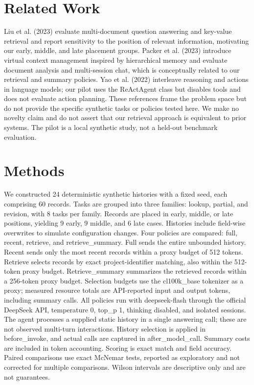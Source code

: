 \documentclass{article}
\begin{document}
\section{Related Work}
Liu et al. (2023) evaluate multi-document question answering and key-value retrieval and report sensitivity to the position of relevant information, motivating our early, middle, and late placement groups. Packer et al. (2023) introduce virtual context management inspired by hierarchical memory and evaluate document analysis and multi-session chat, which is conceptually related to our retrieval and summary policies. Yao et al. (2022) interleave reasoning and actions in language models; our pilot uses the ReActAgent class but disables tools and does not evaluate action planning. These references frame the problem space but do not provide the specific synthetic tasks or policies tested here. We make no novelty claim and do not assert that our retrieval approach is equivalent to prior systems. The pilot is a local synthetic study, not a held-out benchmark evaluation.
\section{Methods}
We constructed 24 deterministic synthetic histories with a fixed seed, each comprising 60 records. Tasks are grouped into three families: lookup, partial, and revision, with 8 tasks per family. Records are placed in early, middle, or late positions, yielding 9 early, 9 middle, and 6 late cases. Histories include field-wise overwrites to simulate configuration changes. Four policies are compared: full, recent, retrieve, and retrieve\_summary. Full sends the entire unbounded history. Recent sends only the most recent records within a proxy budget of 512 tokens. Retrieve selects records by exact project-identifier matching, also within the 512-token proxy budget. Retrieve\_summary summarizes the retrieved records within a 256-token proxy budget. Selection budgets use the cl100k\_base tokenizer as a proxy; measured resource totals are API-reported input and output tokens, including summary calls. All policies run with deepseek-flash through the official DeepSeek API, temperature 0, top\_p 1, thinking disabled, and isolated sessions. The agent processes a supplied static history in a single answering call; these are not observed multi-turn interactions. History selection is applied in before\_invoke, and actual calls are captured in after\_model\_call. Summary costs are included in token accounting. Scoring is exact match and field accuracy. Paired comparisons use exact McNemar tests, reported as exploratory and not corrected for multiple comparisons. Wilson intervals are descriptive only and are not guarantees.
\end{document}
